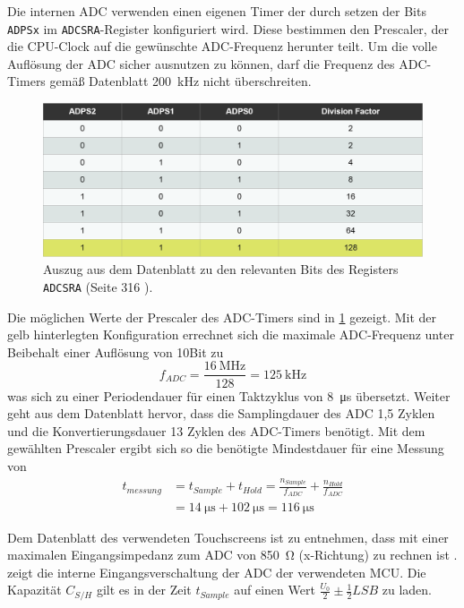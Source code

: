 		Die internen ADC verwenden einen eigenen Timer der durch setzen der Bits \texttt{ADPSx} im \texttt{ADCSRA}-Register konfiguriert wird.
		Diese bestimmen den Prescaler, der die CPU-Clock auf die gewünschte ADC-Frequenz herunter teilt.
		Um die volle Auflösung der ADC sicher ausnutzen zu können, darf die Frequenz des ADC-Timers gemäß Datenblatt \SI{200}{\kilo\hertz} nicht überschreiten.
		\begin{figure}[h]
			\centering
			\includegraphics[width=.9\textwidth]{fig/ADC-Timer_Config.png}
			\caption[Auszug aus dem Datenblatt zu den relevanten Bits des Registers \texttt{ADCSRA}]{Auszug aus dem Datenblatt zu den relevanten Bits des Registers \texttt{ADCSRA} (Seite 316 \cite{MicrochipTechnologyInc.ATmega32U4.Datasheet.2016}).}
			\label{fig:adc timer konfig}
		\end{figure}
		Die möglichen Werte der Prescaler des ADC-Timers sind in \cref{fig:adc timer konfig} gezeigt.
		Mit der gelb hinterlegten Konfiguration errechnet sich die maximale ADC-Frequenz unter Beibehalt einer Auflösung von 10Bit zu
		\begin{equation}
			f_{ADC} = \frac{\SI{16}{\mega\hertz}}{128} = \SI{125}{\kilo\hertz}
			\label{eq:adc timer}
		\end{equation}
		was sich zu einer Periodendauer für einen Taktzyklus von \SI{8}{\micro\second} übersetzt.
		Weiter geht aus dem Datenblatt hervor, dass die Samplingdauer des ADC 1,5 Zyklen und die Konvertierungsdauer 13 Zyklen des ADC-Timers benötigt.
		Mit dem gewählten Prescaler ergibt sich so die benötigte Mindestdauer für eine Messung von
		\begin{align}
			t_{messung} &= t_{Sample} + t_{Hold} = \frac{n_{Sample}}{f_{ADC}} + \frac{n_{Hold}}{f_{ADC}} \nonumber \\
						&= \SI{14}{\micro\second} + \SI{102}{\micro\second} = \SI{116}{\micro\second}
			\label{eq:adc messdauer}
		\end{align}

		Dem Datenblatt des verwendeten Touchscreens ist zu entnehmen, dass mit einer maximalen Eingangsimpedanz zum ADC von \SI{850}{\ohm} (x-Richtung) zu rechnen ist \cite{FUJITSU.touchscreen.datasheet}.
		 zeigt die interne Eingangsverschaltung der ADC der verwendeten MCU. Die Kapazität \(C_{S/H}\) gilt es in der Zeit \(t_{Sample}\) auf einen Wert \(\frac{U_0}{2} \pm \frac{1}{2}LSB\) zu laden.

